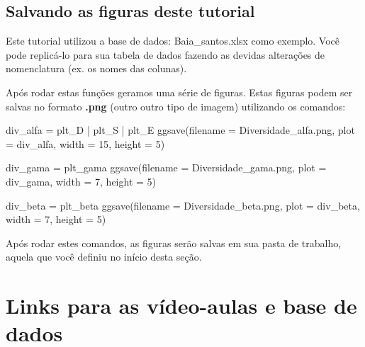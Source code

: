 \documentclass[
]{book}
\newenvironment{Shaded}{\begin{snugshade}}{\end{snugshade}}
\newcommand{\AttributeTok}[1]{\textcolor[rgb]{0.77,0.63,0.00}{#1}}
\newcommand{\DecValTok}[1]{\textcolor[rgb]{0.00,0.00,0.81}{#1}}
\newcommand{\FunctionTok}[1]{\textcolor[rgb]{0.00,0.00,0.00}{#1}}
\newcommand{\NormalTok}[1]{#1}
\newcommand{\OtherTok}[1]{\textcolor[rgb]{0.56,0.35,0.01}{#1}}
\newcommand{\SpecialCharTok}[1]{\textcolor[rgb]{0.00,0.00,0.00}{#1}}
\newcommand{\StringTok}[1]{\textcolor[rgb]{0.31,0.60,0.02}{#1}}
\begin{document}
\hypertarget{salvando-as-figuras-deste-tutorial}{%
\section{Salvando as figuras deste tutorial}\label{salvando-as-figuras-deste-tutorial}}

Este tutorial utilizou a base de dados: Baia\_santos.xlsx como exemplo. Você pode replicá-lo para sua tabela de dados fazendo as devidas alterações de nomenclatura (ex. os nomes das colunas).

Após rodar estas funções geramos uma série de figuras. Estas figuras podem ser salvas no formato \textbf{.png} (outro outro tipo de imagem) utilizando os comandos:

\begin{Shaded}
\begin{Highlighting}[]
\NormalTok{div\_alfa }\OtherTok{=}\NormalTok{ plt\_D }\SpecialCharTok{|}\NormalTok{ plt\_S }\SpecialCharTok{|}\NormalTok{ plt\_E}
\FunctionTok{ggsave}\NormalTok{(}\AttributeTok{filename =} \StringTok{\textquotesingle{}Diversidade\_alfa.png\textquotesingle{}}\NormalTok{, }
       \AttributeTok{plot =}\NormalTok{ div\_alfa, }
       \AttributeTok{width =} \DecValTok{15}\NormalTok{, }\AttributeTok{height =} \DecValTok{5}\NormalTok{)}

\NormalTok{div\_gama }\OtherTok{=}\NormalTok{ plt\_gama}
\FunctionTok{ggsave}\NormalTok{(}\AttributeTok{filename =} \StringTok{\textquotesingle{}Diversidade\_gama.png\textquotesingle{}}\NormalTok{, }
       \AttributeTok{plot =}\NormalTok{ div\_gama, }
       \AttributeTok{width =} \DecValTok{7}\NormalTok{, }\AttributeTok{height =} \DecValTok{5}\NormalTok{)}

\NormalTok{div\_beta }\OtherTok{=}\NormalTok{ plt\_beta}
\FunctionTok{ggsave}\NormalTok{(}\AttributeTok{filename =} \StringTok{\textquotesingle{}Diversidade\_beta.png\textquotesingle{}}\NormalTok{, }
       \AttributeTok{plot =}\NormalTok{ div\_beta,}
       \AttributeTok{width =} \DecValTok{7}\NormalTok{, }\AttributeTok{height =} \DecValTok{5}\NormalTok{)}
\end{Highlighting}
\end{Shaded}

Após rodar estes comandos, as figuras serão salvas em sua pasta de trabalho, aquela que você definiu no início desta seção.

\hypertarget{videoaulas}{%
\chapter{Links para as vídeo-aulas e base de dados}\label{videoaulas}}
\end{document}
